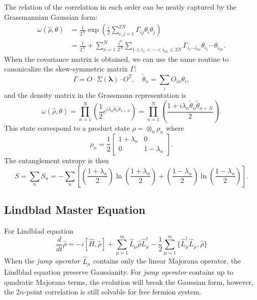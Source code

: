 The relation of the correlation in each order can be neatly captured by the Grassmannian Gaussian form:
\begin{equation}
\begin{aligned}
	\omega(\hat \rho, \theta) 
	&= \frac{1}{2^N} \exp \left(\frac{i}{2} \sum_{i,j=1}^{2N}\Gamma_{ij}\theta_i \theta_j \right) \\
	&=\frac{1}{2^N} + \sum_{n=1}^{N}\frac{i^n}{2^N}\sum_{1\le i_{1}<\cdots<i_{2n} \le 2N}\Gamma_{i_{1}\cdots i_{2n}} \theta_{i_1} \cdots \theta_{i_{2n}}.
\end{aligned}
\end{equation}
When the covariance matrix is obtained, we can use the same routine to canonicalize the skew-symmetric matrix $\Gamma$:
\begin{equation*}
	\Gamma = O \cdot \Sigma(\bm \lambda) \cdot O^T, \quad
	\tilde\theta_n = \sum_i O_{in} \theta_i,
\end{equation*}
and the density matrix in the Grassmann representation is
\begin{equation}
	\omega(\hat \rho, \theta) 
	= \prod_{n=1}^N \left(\frac{1}{2} e^{i \lambda_n \tilde\theta_n \tilde\theta_{n+N}} \right)
	= \prod_{n=1}^N \left(\frac{1+i\lambda_n \tilde\theta_n\tilde\theta_{n+N}}{2}  \right).
\end{equation}
This state correspond to a product state $\rho = \otimes_n \rho_n$ where
\begin{equation}
	\rho_n = \frac{1}{2} \left[\begin{array}{cc}
		1 + \lambda_n & 0 \\
		0 & 1 - \lambda_n
	\end{array} \right].
\end{equation}
The entanglement entropy is then
\begin{equation}
	S=\sum_n S_n = -\sum_n \left[
	\left(\frac{1+\lambda_n}{2}\right)\ln\left(\frac{1+\lambda_n}{2}\right)
	+ \left(\frac{1-\lambda_n}{2}\right)\ln\left(\frac{1-\lambda_n}{2}\right)\right].
\end{equation}



\subsection{Lindblad Master Equation}
For Lindblad equation
\begin{equation}
	\frac{d}{dt} \hat\rho = -i[\hat H, \hat \rho] + \sum_{\mu=1}^{m} \hat L_\mu \hat\rho \hat L_\mu^\dagger -\frac{1}{2} \sum_{\mu=1}^{m} \{\hat L_\mu^\dagger \hat L_\mu, \hat \rho\}
\end{equation}
When the \textit{jump operator} $\hat L_\mu$ contains only the linear Majorana operator, the Lindblad equation preserve Gaussianity. 
For \textit{jump operator} contains up to quadratic Majorana terms, the evolution will break the Gaussian form, however, the $2n$-point correlation is still solvable for free fermion system.

